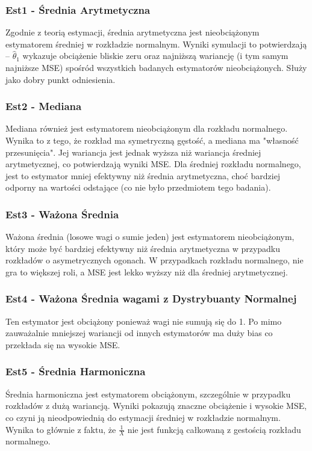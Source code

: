\documentclass[a4paper,12pt]{article}
\begin{document}
\subsubsection{Est1 - Średnia Arytmetyczna}
Zgodnie z teorią estymacji, średnia arytmetyczna jest nieobciążonym estymatorem średniej w rozkładzie normalnym.
Wyniki symulacji to potwierdzają – $\hat{\theta}_1$ wykazuje obciążenie bliskie zeru 
oraz najniższą wariancję (i tym samym najniższe MSE) spośród wszystkich badanych estymatorów nieobciążonych. 
Służy jako dobry punkt odniesienia.

\subsubsection{Est2 - Mediana}
Mediana również jest estymatorem nieobciążonym dla rozkładu normalnego. 
Wynika to z tego, że rozkład ma symetryczną gęstość, a mediana ma "własność przesunięcia".
Jej wariancja jest jednak wyższa niż wariancja średniej arytmetycznej,
co potwierdzają wyniki MSE. 
Dla średniej rozkładu normalnego, jest to estymator mniej efektywny niż średnia arytmetyczna, 
choć bardziej odporny na wartości odstające (co nie było przedmiotem tego badania).

\subsubsection{Est3 - Ważona Średnia}
Ważona średnia (losowe wagi o sumie jeden) jest estymatorem nieobciążonym, który może być bardziej efektywny niż średnia arytmetyczna w przypadku rozkładów o asymetrycznych ogonach.
W przypadkach rozkładu normalnego, nie gra to większej roli, a MSE jest lekko wyższy niż dla średniej arytmetycznej.

\subsubsection{Est4 - Ważona Średnia wagami z Dystrybuanty Normalnej}
Ten estymator jest obciążony ponieważ wagi nie sumują się do 1. Po mimo zauważalnie mniejszej wariancji 
od innych estymatorów ma duży bias co przekłada się na wysokie MSE.

\subsubsection{Est5 - Średnia Harmoniczna}
Średnia harmoniczna jest estymatorem obciążonym, szczególnie w przypadku rozkładów z dużą wariancją.
Wyniki pokazują znaczne obciążenie i wysokie MSE, co czyni ją nieodpowiednią do estymacji średniej w rozkładzie normalnym.
Wynika to głównie z faktu, że $\frac{1}{X}$ nie jest funkcją całkowaną z gestością rozkładu normalnego.
\end{document}
